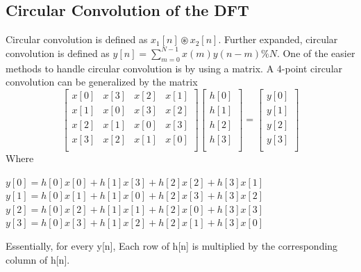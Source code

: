 \documentclass{article}
\begin{document}
\subsection{Circular Convolution of the DFT}
Circular convolution is defined as $x_1[n] \circledast x_2[n]$. Further expanded, circular convolution is defined as $y[n] = \sum_{m=0}^{N-1}x(m)y(n-m)\%N$. One of the easier methods to handle circular convolution is by using a matrix. A 4-point circular convolution can be generalized by the matrix\\
\[
\begin{bmatrix}
   x[0]  & x[3] & x[2] & x[1]  \\
    x[1] & x[0] & x[3] & x[2]    \\
    x[2]  & x[1] & x[0] & x[3]  \\
    x[3] & x[2] & x[1] & x[0]    \\    
\end{bmatrix}
\begin{bmatrix}
    h[0] \\
    h[1]  \\
    h[2] \\
    h[3]  \\
\end{bmatrix}=
\begin{bmatrix}
    y[0] \\
    y[1]  \\
    y[2] \\
    y[3] \\
\end{bmatrix}
\]
Where 
\begin{center}
$y[0] =  h[0]x[0] + h[1]x[3] + h[2]x[2] + h[3]x[1]$ \\
$y[1] = h[0]x[1] + h[1]x[0] + h[2]x[3] + h[3]x[2]$ \\
$y[2] =h[0]x[2] + h[1]x[1] + h[2]x[0] + h[3]x[3]$ \\
$y[3] =h[0]x[3] + h[1]x[2] + h[2]x[1] + h[3]x[0] $ 
\end{center}
Essentially, for every y[n], Each row of h[n] is multiplied by the corresponding column of h[n]. \\
\end{document}
